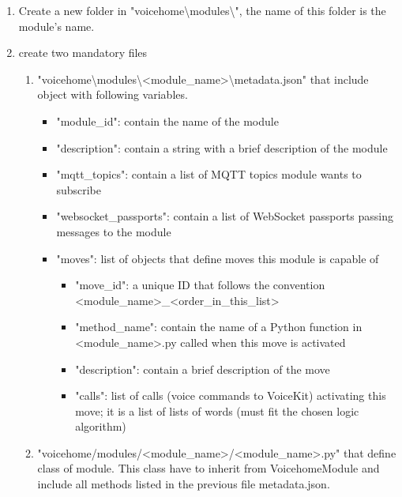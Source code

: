 \begin{enumerate}[label=\arabic*)]
    \item Create a new folder in "voicehome\textbackslash modules\textbackslash ", the name of this folder is the module's name.
    \item create two mandatory files
    \begin{enumerate}[label=\arabic*)]
        \item "voicehome\textbackslash modules\textbackslash <module\_name>\textbackslash metadata.json" that include object with following variables.
        \begin{itemize}
            \item "module\_id": contain the name of the module
            \item "description": contain a string with a brief description of the module
            \item "mqtt\_topics": contain a list of MQTT topics module wants to subscribe
            \item "websocket\_passports": contain a list of WebSocket passports passing messages to the module
            \item "moves": list of objects that define moves this module is capable of
            \begin{itemize}
                \item "move\_id": a unique ID that follows the convention <module\_name>\_<order\_in\_this\_list>
                \item "method\_name": contain the name of a Python function in <module\_name>.py called when this move is activated
                \item "description": contain a brief description of the move
                \item "calls": list of calls (voice commands to VoiceKit) activating this move; it is a list of lists of words (must fit the chosen logic algorithm)
            \end{itemize}
        \end{itemize}
        \item "voicehome/modules/<module\_name>/<module\_name>.py" that define class of module. This class have to inherit from VoicehomeModule and include all methods listed in the previous file metadata.json.
        
        
    \end{enumerate}
\end{enumerate}

